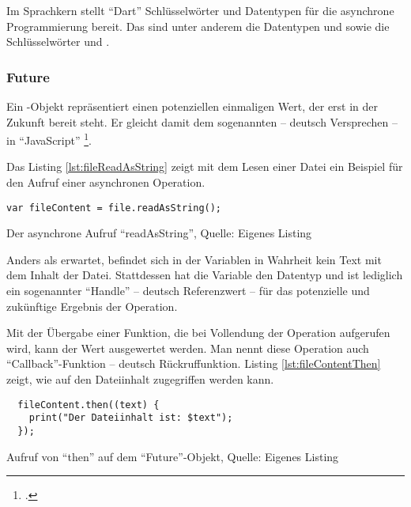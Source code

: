 Im Sprachkern stellt \enquote{Dart} Schlüsselwörter und Datentypen für die asynchrone Programmierung bereit.
Das sind unter anderem die Datentypen  und  sowie die Schlüsselwörter  und .

\subsubsection{Future}
Ein -Objekt repräsentiert einen potenziellen einmaligen Wert, der erst in der Zukunft bereit steht.
Er gleicht damit dem sogenannten  -- deutsch Versprechen -- in \enquote{JavaScript}  \footcite[Vgl.][]{PromiseJavaScriptMDN}.

Das Listing \ref{lst:fileReadAsString} zeigt mit dem Lesen einer Datei ein Beispiel für den Aufruf einer asynchronen Operation.

\ifIncludeFigures
  \begin{listing}[ht]
    \begin{verbatim}
var fileContent = file.readAsString();
\end{verbatim}
    \caption[Der asynchrone Aufruf \enquote{readAsString}]{Der asynchrone Aufruf \enquote{readAsString}, Quelle: Eigenes Listing}
    \label{lst:fileReadAsString}
  \end{listing}
\fi

Anders als erwartet, befindet sich in der Variablen  in Wahrheit kein Text mit dem Inhalt der Datei.
Stattdessen hat die Variable den Datentyp  und ist lediglich ein sogenannter \enquote{Handle} -- deutsch Referenzwert -- für das potenzielle und zukünftige Ergebnis der Operation.

Mit der Übergabe einer Funktion, die bei Vollendung der Operation aufgerufen wird, kann der Wert ausgewertet werden.
Man nennt diese Operation auch \enquote{Callback}-Funktion -- deutsch Rückruffunktion.
Listing \ref{lst:fileContentThen}
zeigt, wie auf den Dateiinhalt zugegriffen werden kann.

\ifIncludeFigures
  \begin{listing}[ht]
    \begin{verbatim}
  fileContent.then((text) {
    print("Der Dateiinhalt ist: $text");
  });
\end{verbatim}
    \caption[Aufruf von \enquote{then} auf dem \enquote{Future}-Objekt]{Aufruf von \enquote{then} auf dem \enquote{Future}-Objekt, Quelle: Eigenes Listing}
    \label{lst:fileContentThen}
  \end{listing}
\fi

